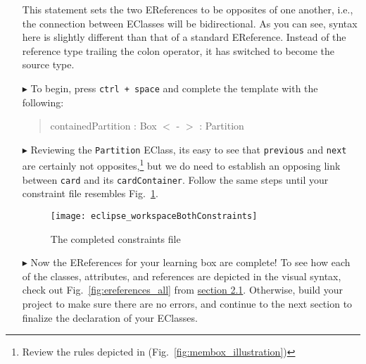 \begin{itemize}
This statement sets the two EReferences to be opposites of one another, i.e., the connection between EClasses will be bidirectional. As you can see, syntax here
is slightly different than that of a standard EReference. Instead of the reference type trailing the colon operator, it has switched to become the source type.

\item[$\blacktriangleright$] To begin, press \texttt{ctrl + space} and complete the template with the following:

{\begin{quote} \small
	containedPartition : Box $<$ - $>$ : Partition
\end{quote}}

\item[$\blacktriangleright$] Reviewing the \texttt{Partition} EClass, its easy to see that \texttt{previous} and \texttt{next} are certainly not
opposites,\footnote{Review the rules depicted in (Fig.~\ref{fig:membox_illustration})} but we do need to establish an opposing link between
\texttt{card} and its \texttt{cardContainer}. Follow the same steps until your constraint file resembles Fig.~\ref{fig:bothConstraints}.

\begin{figure}[htbp]
	\centering
  \texttt{[image: eclipse\_workspaceBothConstraints]}
	\caption{The completed constraints file}
	\label{fig:bothConstraints}
\end{figure} 

\item[$\blacktriangleright$] Now the EReferences for your learning box are complete! To see how each of the classes, attributes, and references
are depicted in the visual syntax, check out Fig.~\ref{fig:ereferences_all} from \hyperlink{sec:static vis}{section 2.1}. Otherwise, build your project to
make sure there are no errors, and continue to the next section to finalize the declaration of your EClasses.


\end{itemize}
